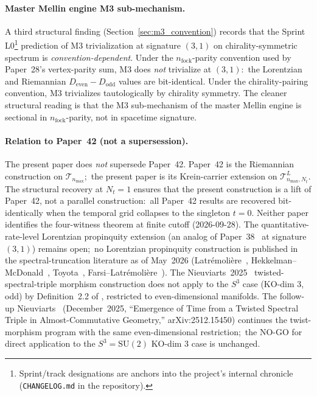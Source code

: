 \documentclass[11pt,a4paper]{article}
\theoremstyle{plain}
\theoremstyle{definition}
\newcommand{\nmax}{n_{\max}}
\newcommand{\Nt}{N_t}
\newcommand{\sthree}{S^{3}}
\newcommand{\Tcal}{\mathcal{T}}
\newcommand{\SU}{\mathrm{SU}}
\begin{document}
\paragraph{Master Mellin engine M3 sub-mechanism.}
A third structural finding (Section~\ref{sec:m3_convention}) records
that the Sprint L0\footnote{Sprint/track designations are anchors into the project's internal chronicle (\texttt{CHANGELOG.md} in the repository).} prediction of M3 trivialization at signature
$(3, 1)$ on chirality-symmetric spectrum is \emph{convention-dependent}.
Under the $n_\text{fock}$-parity convention used by Paper~28's
vertex-parity sum, M3 does \emph{not} trivialize at $(3, 1)$:\ the
Lorentzian and Riemannian $D_{\text{even}} - D_{\text{odd}}$ values
are bit-identical. Under the chirality-pairing convention, M3
trivializes tautologically by chirality symmetry. The cleaner
structural reading is that the M3 sub-mechanism of the master Mellin
engine is sectional in $n_\text{fock}$-parity, not in spacetime
signature.

\paragraph{Relation to Paper~42 (not a supersession).}
The present paper does \emph{not} supersede Paper~42. Paper~42 is the
Riemannian construction on $\Tcal_{\nmax}$;\ the present paper is its
Krein-carrier extension on $\Tcal_{\nmax, \Nt}^L$. The structural
recovery at $\Nt = 1$ ensures that the present construction is a lift
of Paper~42, not a parallel construction:\ all Paper~42 results are
recovered bit-identically when the temporal grid collapses to the
singleton $t = 0$. Neither paper identifies the four-witness theorem
at finite cutoff (2026-09-28). The
quantitative-rate-level Lorentzian propinquity extension (an analog of
Paper~38~\cite{paper38} at signature $(3, 1)$) remains open;\ no
Lorentzian propinquity construction is published in the
spectral-truncation literature as of May~2026
(Latr\'emoli\`ere~\cite{latremoliere2018, latremoliere_metric_st_2017},
Hekkelman--McDonald~\cite{hekkelman_mcdonald2024b}, Toyota~\cite{toyota2023},
Farsi--Latr\'emoli\`ere~\cite{farsi_latremoliere2024,
farsi_latremoliere2025}). The Nieuviarts~2025~\cite{nieuviarts2025a}
twisted-spectral-triple morphism construction does not apply to the
$\sthree$ case (KO-dim 3, odd) by Definition~2.2 of
\cite{nieuviarts2025a}, restricted to even-dimensional manifolds.
The follow-up Nieuviarts~\cite{nieuviarts2025b_proceedings}
(December~2025, ``Emergence of Time from a Twisted Spectral Triple in
Almost-Commutative Geometry,'' arXiv:2512.15450) continues the
twist-morphism program with the same even-dimensional restriction;\
the NO-GO for direct application to the $\sthree = \SU(2)$ KO-dim 3
case is unchanged.
\end{document}
